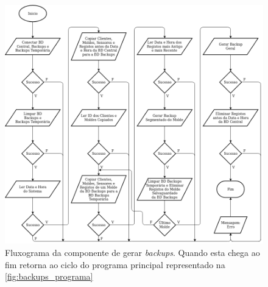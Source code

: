 \documentclass[11pt,twoside,a4paper]{report}
\begin{document}
\begin{figure}
	\begin{center}
		\includegraphics[width=1\textwidth]{fluxograma_backups_gerar02} %
		\caption[Fluxograma da componente de gerar \textit{backups}]{Fluxograma da componente de gerar \textit{backups}. Quando esta chega ao fim retorna ao ciclo do programa principal representado na \autoref{fig:backups_programa}}
		\label{fig:backups_gerar}
	\end{center}
\end{figure}
\end{document}
